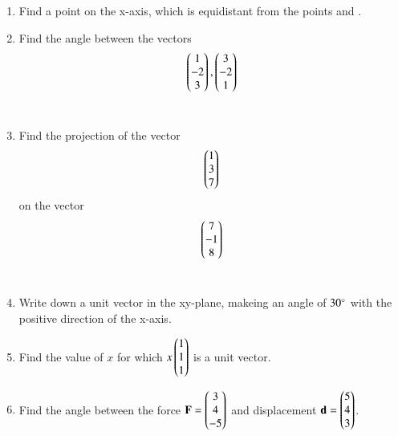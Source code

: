 \begin{enumerate}[label=\arabic*.,ref=\thesubsection.\theenumi]
\\
\solution 

\item Find a point on the x-axis, which is equidistant from the points  and .
\\
\solution 

\item Find the angle between the vectors 
\begin{align}
\begin{pmatrix}1\\-2\\3\end{pmatrix},
\begin{pmatrix}3\\-2\\1\end{pmatrix}
\end{align}
\\
\solution 


\item Find the projection of the vector 
\begin{align}
\begin{pmatrix}1\\3\\7\end{pmatrix}
\end{align}
on the vector
\begin{align}
\begin{pmatrix}7\\-1\\8\end{pmatrix}
\end{align}
\\
\solution 

\item Write down a unit vector in the xy-plane, makeing an angle of $30\degree$ with the positive direction of the x-axis.
\\
\solution 


\item Find the value of $x$ for which $x\begin{pmatrix}1\\1\\1\end{pmatrix}$ is a unit vector.
\\
\solution

\item Find the angle between the force $\mathbf{F} = \begin{pmatrix}3\\4\\-5\end{pmatrix}$ and displacement $\mathbf{d} = \begin{pmatrix}5\\4\\3\end{pmatrix}$.
%
\\
\solution 



\end{enumerate}
